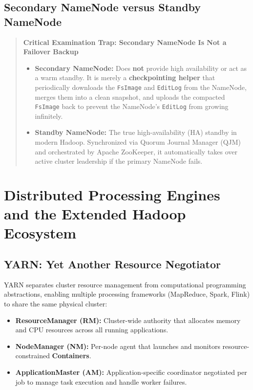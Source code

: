 \subsection{Secondary NameNode versus Standby NameNode}
\begin{quote}
\textbf{Critical Examination Trap: Secondary NameNode Is Not a Failover Backup}
\begin{itemize}
    \item \textbf{Secondary NameNode:} Does \textbf{not} provide high availability or act as a warm standby. It is merely a \textbf{checkpointing helper} that periodically downloads the \texttt{FsImage} and \texttt{EditLog} from the NameNode, merges them into a clean snapshot, and uploads the compacted \texttt{FsImage} back to prevent the NameNode's \texttt{EditLog} from growing infinitely.
    \item \textbf{Standby NameNode:} The true high-availability (HA) standby in modern Hadoop. Synchronized via Quorum Journal Manager (QJM) and orchestrated by Apache ZooKeeper, it automatically takes over active cluster leadership if the primary NameNode fails.
\end{itemize}
\end{quote}

\section{Distributed Processing Engines and the Extended Hadoop Ecosystem}
\label{sec:dbms_hadoop_ecosystem}

\subsection{YARN: Yet Another Resource Negotiator}
YARN separates cluster resource management from computational programming abstractions, enabling multiple processing frameworks (MapReduce, Spark, Flink) to share the same physical cluster:
\begin{itemize}
    \item \textbf{ResourceManager (RM):} Cluster-wide authority that allocates memory and CPU resources across all running applications.
    \item \textbf{NodeManager (NM):} Per-node agent that launches and monitors resource-constrained \textbf{Containers}.
    \item \textbf{ApplicationMaster (AM):} Application-specific coordinator negotiated per job to manage task execution and handle worker failures.
\end{itemize}

